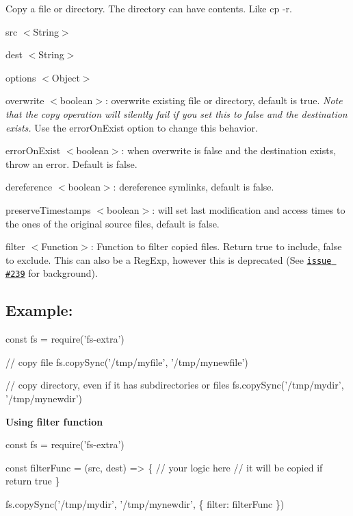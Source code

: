 Copy a file or directory. The directory can have contents. Like {\ttfamily cp -\/r}.


\begin{DoxyItemize}
\item {\ttfamily src} {\ttfamily $<$String$>$}
\item {\ttfamily dest} {\ttfamily $<$String$>$}
\item {\ttfamily options} {\ttfamily $<$Object$>$}
\begin{DoxyItemize}
\item {\ttfamily overwrite} {\ttfamily $<$boolean$>$}\+: overwrite existing file or directory, default is {\ttfamily true}. {\itshape Note that the copy operation will silently fail if you set this to {\ttfamily false} and the destination exists.} Use the {\ttfamily error\+On\+Exist} option to change this behavior.
\item {\ttfamily error\+On\+Exist} {\ttfamily $<$boolean$>$}\+: when {\ttfamily overwrite} is {\ttfamily false} and the destination exists, throw an error. Default is {\ttfamily false}.
\item {\ttfamily dereference} {\ttfamily $<$boolean$>$}\+: dereference symlinks, default is {\ttfamily false}.
\item {\ttfamily preserve\+Timestamps} {\ttfamily $<$boolean$>$}\+: will set last modification and access times to the ones of the original source files, default is {\ttfamily false}.
\item {\ttfamily filter} {\ttfamily $<$Function$>$}\+: Function to filter copied files. Return {\ttfamily true} to include, {\ttfamily false} to exclude. This can also be a Reg\+Exp, however this is deprecated (See \href{https://github.com/jprichardson/node-fs-extra/issues/239}{\tt issue \#239} for background).
\end{DoxyItemize}
\end{DoxyItemize}

\subsection*{Example\+:}


\begin{DoxyCode}
const fs = require('fs-extra')

// copy file
fs.copySync('/tmp/myfile', '/tmp/mynewfile')

// copy directory, even if it has subdirectories or files
fs.copySync('/tmp/mydir', '/tmp/mynewdir')
\end{DoxyCode}


{\bfseries Using filter function}


\begin{DoxyCode}
const fs = require('fs-extra')

const filterFunc = (src, dest) => \{
  // your logic here
  // it will be copied if return true
\}

fs.copySync('/tmp/mydir', '/tmp/mynewdir', \{ filter: filterFunc \})
\end{DoxyCode}
 
